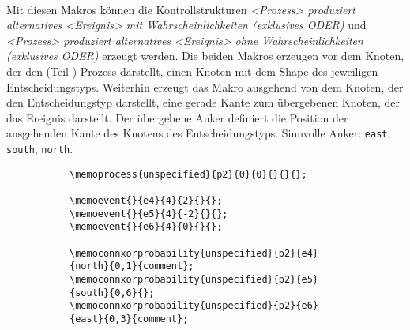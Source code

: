 \documentclass[12pt, a4paper]{article}
\begin{document}
\noindent\DescribeMacro{\memoconnxor}\newline
\DescribeMacro{\memoconnxorprobability}\indent\indent{}\\\medskip

\noindent Mit diesen Makros können die Kontrollstrukturen \textit{<Prozess> produziert alternatives <Ereignis> mit Wahrscheinlichkeiten (exklusives ODER)} und \textit{<Prozess> produziert alternatives <Ereignis> ohne Wahrscheinlichkeiten (exklusives ODER)} erzeugt werden.
Die beiden Makros erzeugen vor dem Knoten, der den (Teil-) Prozess darstellt, einen Knoten mit dem Shape des jeweiligen Entscheidungstyps. Weiterhin erzeugt das Makro ausgehend von dem Knoten, der den Entscheidungstyp darstellt, eine gerade Kante zum übergebenen Knoten, der das Ereignis darstellt. Der übergebene Anker definiert die Position der ausgehenden Kante des Knotens des Entscheidungstyps. Sinnvolle Anker: \texttt{east}, \texttt{south}, \texttt{north}.
\begin{figure}[htbp]
    \centering
    \caption[Beispiel: Produktion eines alternativen Ereignisses mit Wahrscheinlichkeit.]{Beispiel: Produktion eines alternativen Ereignisses mit Wahrscheinlichkeit.}
    \begin{subfigure}{0.4\textwidth}
        \centering
    \end{subfigure}
    \begin{subfigure}{0.6\textwidth}
        \centering
        \begin{lstlisting}
\memoprocess{unspecified}{p2}{0}{0}{}{}{};
                 
\memoevent{}{e4}{4}{2}{}{};       
\memoevent{}{e5}{4}{-2}{}{}; 
\memoevent{}{e6}{4}{0}{}{};
            
\memoconnxorprobability{unspecified}{p2}{e4}{north}{0,1}{comment};
\memoconnxorprobability{unspecified}{p2}{e5}{south}{0,6}{};
\memoconnxorprobability{unspecified}{p2}{e6}{east}{0,3}{comment};            
        \end{lstlisting}
    \end{subfigure}
    \label{fig:EntscheidungMit}
\end{figure}
\end{document}

